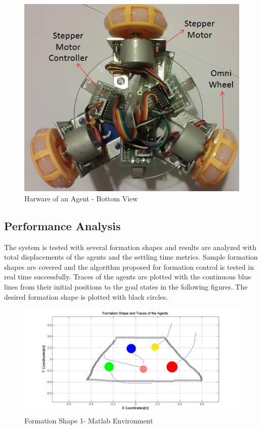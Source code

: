 \documentclass[twoside]{article}
\begin{document}
		\begin{figure}[H]
			\caption{Harware of an Agent - Bottom View}
			\centerline{\includegraphics[scale = 0.80]{hardware2}}
		\end{figure} 
		
		\subsection{Performance Analysis}
		The system is tested with several formation shapes and results are analyzed with total displacements of the agents and the settling time metrics. Sample formation shapes are covered  and the algorithm proposed for formation control is tested in real time successfully.  Traces of the agents are plotted with the continuous blue lines from their initial positions to the goal states in the following figures. The desired formation shape is plotted with black circles. 
		
		
			\begin{figure}[H]
				\caption{Formation Shape 1- Matlab Environment}
				\centerline{\includegraphics[scale = 0.45]{2_hardware}}
			\end{figure} 
			
\end{document}
